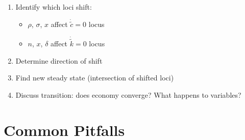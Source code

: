 \documentclass[a4paper,11pt]{article}
\newcommand{\ktilde}{\tilde{k}}
\newcommand{\ctilde}{\tilde{c}}
\begin{document}
\begin{enumerate}
    \item Identify which loci shift:
        \begin{itemize}
            \item $\rho$, $\sigma$, $x$ affect $\dot{\ctilde} = 0$ locus
            \item $n$, $x$, $\delta$ affect $\dot{\ktilde} = 0$ locus
        \end{itemize}
    \item Determine direction of shift
    \item Find new steady state (intersection of shifted loci)
    \item Discuss transition: does economy converge? What happens to variables?
\end{enumerate}

\section{Common Pitfalls}
\end{document}
